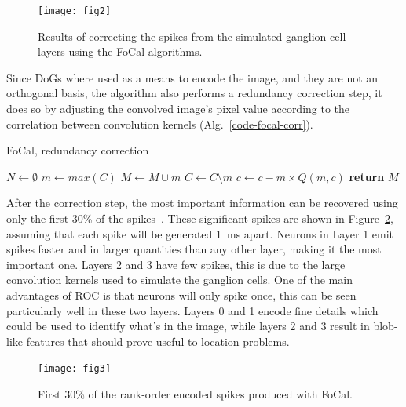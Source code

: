 \documentclass{frontiersENG} %
\begin{document}
\begin{figure}[hbt]
	\centering
	\texttt{[image: fig2]}
	\caption{Results of correcting the spikes from the simulated ganglion cell layers using the FoCal algorithms.}
	\label{fig-convolution-results}
\end{figure}
Since DoGs where used as a means to encode the image, and they are not an orthogonal basis, the algorithm also performs a redundancy correction step, it does so by 
adjusting the convolved image's pixel value according to the correlation 
between convolution kernels (Alg.~\ref{code-focal-corr}).
\begin{algorithm}[h]
	\caption{FoCal, redundancy correction}
	\label{code-focal-corr}
	\begin{algorithmic}
		\State $N \leftarrow \emptyset$ 
		\Repeat
		\State $m \leftarrow max(C)$
		\State $M \leftarrow M \cup m$
		\State $C \leftarrow C \setminus m$
		 
		 
		\State $c \leftarrow c - m \times Q(m, c)$
		\EndIf
		\EndFor
		\State \textbf{return} $M$
		\EndProcedure
	\end{algorithmic}
\end{algorithm}


After the correction step, the most important information can be recovered using only the first 30\% of the spikes~\citep{sen2009evaluating}. These significant spikes are shown in Figure~\ref{fig-raster-plot-30pc}, assuming that each spike will be generated 1~ms apart. Neurons in Layer 1 emit spikes faster and in larger quantities than any other layer, making it the most important one. Layers 2 and 3 have few spikes, this is due to the large convolution kernels used to simulate the ganglion cells. One of the main advantages of ROC is that neurons will only spike once, this can be seen particularly well in these two layers. Layers 0 and 1 encode fine details which could be used to identify what's in the image, while layers 2 and 3 result in blob-like features that should prove useful to location problems.
\begin{figure}[hbt]
	\centering
	\texttt{[image: fig3]}
	\caption{First 30\% of the rank-order encoded spikes produced with FoCal.}
	\label{fig-raster-plot-30pc}
\end{figure}
\end{document}
